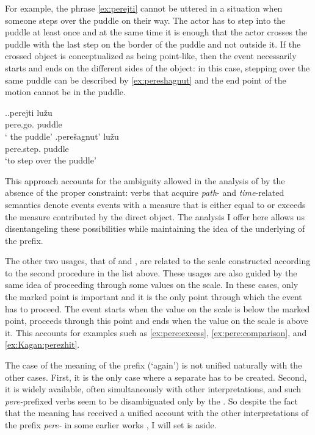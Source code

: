 For example, the phrase \ref{ex:perejti} cannot be uttered in a situation when someone steps over the puddle on their way. The actor has to step into the puddle at least once and at the same time it is enough that the actor crosses the puddle with the last step on the border of the puddle and not outside it. If the crossed object is conceptualized as being point-like, then the event necessarily starts and ends on the different sides of the object: in this case, stepping over the same puddle can be described by \ref{ex:pereshagnut} and the end point of the motion cannot be in the puddle.


\ex.\ag.\label{ex:perejti}perejti lu\v{z}u\\
pere.go. puddle\\
\trans ` the puddle'
\bg.\label{ex:pereshagnut}pere\v{s}agnut' lu\v{z}u\\
pere.step. puddle\\
\trans `to step over the puddle'

This approach accounts for the ambiguity allowed in the analysis of \citet{Kagan:book} by the absence of the proper  constraint: verbs that acquire \textit{path}- and \textit{time}-related semantics denote events events with a measure that is either equal to or exceeds the measure contributed by the direct object. The analysis I offer here allows us disentangeling these possibilities while maintaining the idea of the underlying  of the prefix.

The other two usages, that of  and , are related to the scale constructed according to the second procedure in the list above. These usages are also guided by the same idea of proceeding through some values on the scale. In these cases, only the marked point is important and it is the only point through which the event has to proceed. The event starts when the value on the scale is below the marked point, proceeds through this point and ends when the value on the scale is above it. This accounts for examples such as \ref{ex:pere:excess}, \ref{ex:pere:comparison}, and \ref{ex:Kagan:perezhit}.

The case of the  meaning of the prefix (`again') is not unified naturally with the other cases. First, it is the only case where a separate  has to be created. Second, it is widely available, often simultaneously with other interpretations, and such \textit{pere-}prefixed verbs seem to be disambiguated only by the . So despite the fact that the  meaning has received a unified account with the other interpretations of the prefix \textit{pere-} in some earlier works \citep{Demjjanow:97, Kagan:book}, I will set is aside.

